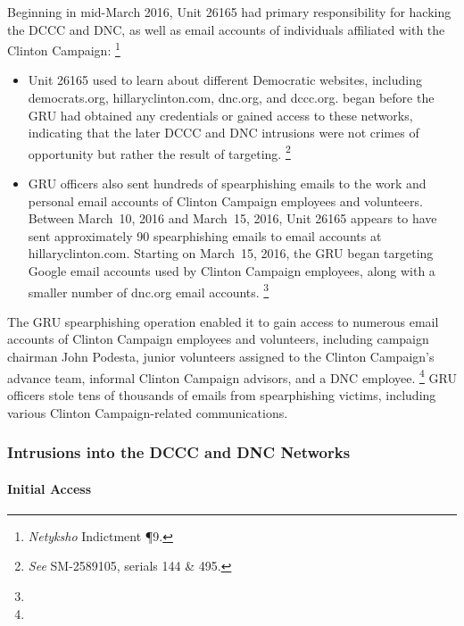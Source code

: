 Beginning in mid-March 2016, Unit 26165 had primary responsibility for hacking the DCCC and DNC, as well as email accounts of individuals affiliated with the Clinton Campaign:%
\footnote{\textit{Netyksho} Indictment \P 9.}

\begin{itemize}
    \item Unit 26165 used  to learn about  different Democratic websites, including democrats.org, hillaryclinton.com, dnc.org, and dccc.org.
     began before the GRU had obtained any credentials or gained access to these networks,  indicating that the later DCCC and DNC intrusions were not crimes of opportunity but rather the result of targeting.%
    \footnote{\textit{See} SM-2589105, serials 144 \& 495.}
    \item GRU officers also sent hundreds of spearphishing emails to the work and personal email accounts of Clinton Campaign employees and volunteers.
    Between March~10, 2016 and March~15, 2016, Unit 26165 appears to have sent approximately 90 spearphishing emails to email accounts at hillaryclinton.com.
    Starting on March~15, 2016, the GRU began targeting Google email accounts used by Clinton Campaign employees, along with a smaller number of dnc.org email accounts.%
    \footnote{}
\end{itemize}

The GRU spearphishing operation enabled it to gain access to numerous email accounts of Clinton Campaign employees and volunteers, including campaign chairman John Podesta, junior volunteers assigned to the Clinton Campaign's advance team, informal Clinton Campaign advisors, and a DNC employee.%
\footnote{}
GRU officers stole tens of thousands of emails from spearphishing victims, including various Clinton Campaign-related communications.

\subsubsection{Intrusions into the DCCC and DNC Networks}

\paragraph{Initial Access}

